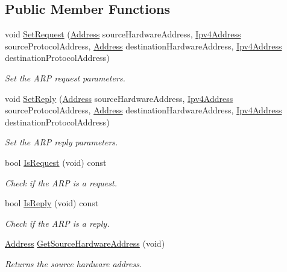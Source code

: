 \subsection*{Public Member Functions}
\begin{DoxyCompactItemize}
\item 
void \hyperlink{classns3_1_1ArpHeader_a9d46d7c24b7dcd14cd2455c553aabb12}{Set\+Request} (\hyperlink{classns3_1_1Address}{Address} source\+Hardware\+Address, \hyperlink{classns3_1_1Ipv4Address}{Ipv4\+Address} source\+Protocol\+Address, \hyperlink{classns3_1_1Address}{Address} destination\+Hardware\+Address, \hyperlink{classns3_1_1Ipv4Address}{Ipv4\+Address} destination\+Protocol\+Address)
\begin{DoxyCompactList}\small\item\em Set the A\+RP request parameters. \end{DoxyCompactList}\item 
void \hyperlink{classns3_1_1ArpHeader_a71a5d0a09e7ccc2525c725858a2916cf}{Set\+Reply} (\hyperlink{classns3_1_1Address}{Address} source\+Hardware\+Address, \hyperlink{classns3_1_1Ipv4Address}{Ipv4\+Address} source\+Protocol\+Address, \hyperlink{classns3_1_1Address}{Address} destination\+Hardware\+Address, \hyperlink{classns3_1_1Ipv4Address}{Ipv4\+Address} destination\+Protocol\+Address)
\begin{DoxyCompactList}\small\item\em Set the A\+RP reply parameters. \end{DoxyCompactList}\item 
bool \hyperlink{classns3_1_1ArpHeader_a1377630fb352b132c11c6c0ca39034f4}{Is\+Request} (void) const 
\begin{DoxyCompactList}\small\item\em Check if the A\+RP is a request. \end{DoxyCompactList}\item 
bool \hyperlink{classns3_1_1ArpHeader_a0c2401200618a4d3cbbee9b0ecde01c2}{Is\+Reply} (void) const 
\begin{DoxyCompactList}\small\item\em Check if the A\+RP is a reply. \end{DoxyCompactList}\item 
\hyperlink{classns3_1_1Address}{Address} \hyperlink{classns3_1_1ArpHeader_afa73417e43b1c1ee39956a09a9922767}{Get\+Source\+Hardware\+Address} (void)
\begin{DoxyCompactList}\small\item\em Returns the source hardware address. \end{DoxyCompactList}\item 

\end{DoxyCompactItemize}
